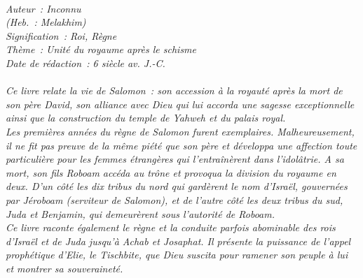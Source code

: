 \BFont
\noindent\hrulefill
{\footnotesize
\textit{
\bigskip
{\centering{}
\\Auteur~: Inconnu
\\(Heb.~: Melakhim)
\\Signification~: Roi, Règne
\\Thème~: Unité du royaume après le schisme
\\Date de rédaction~: 6 siècle av. J.-C.\\}
}
\textit{
\\Ce livre relate la vie de Salomon~: son accession à la royauté après la mort de son père David, son alliance avec Dieu qui lui accorda une sagesse exceptionnelle ainsi que la construction du temple de Yahweh et du palais royal.
\\Les premières années du règne de Salomon furent exemplaires. Malheureusement, il ne fit pas preuve de la même piété que son père et développa une affection toute particulière pour les femmes étrangères qui l’entraînèrent dans l'idolâtrie. A sa mort, son fils Roboam accéda au trône et provoqua la division du royaume en deux. D'un côté les dix tribus du nord qui gardèrent le nom d'Israël, gouvernées par Jéroboam (serviteur de Salomon), et de l'autre côté les deux tribus du sud, Juda et Benjamin, qui demeurèrent sous l'autorité de Roboam.
\\Ce livre raconte également le règne et la conduite parfois abominable des rois d'Israël et de Juda jusqu'à Achab et Josaphat. Il présente la puissance de l'appel prophétique d'Elie, le Tischbite, que Dieu suscita pour ramener son peuple à lui et montrer sa souveraineté.\bigskip
}
}
\par\nobreak\noindent\hrulefill
